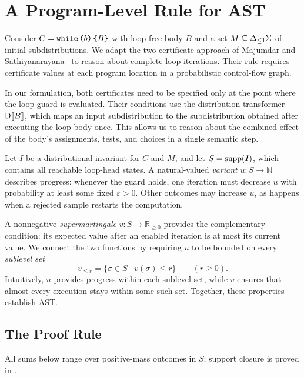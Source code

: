 \section{A Program-Level Rule for AST}
\label{sec:rule}

Consider $C=\textnormal{\texttt{while}}\,\textnormal{\texttt{(}} b\textnormal{\texttt{)}}\,\textnormal{\texttt{\{}} B\textnormal{\texttt{\}}}$ with loop-free body $B$ and a set
$M\subseteq{\Delta_{\leq 1}\Sigma}$ of initial subdistributions.
We adapt the two-certificate approach of Majumdar and
Sathiyanarayana~\cite{DBLP:journals/pacmpl/MajumdarS25}
to reason about complete loop iterations.
Their rule requires certificate values at each program location
in a probabilistic control-flow graph.

In our formulation, both certificates need to be specified
only at the point where the loop guard is evaluated.
Their conditions use the distribution transformer $\mathsf{D}\llbracket B\rrbracket$,
which maps an input subdistribution to the subdistribution
obtained after executing the loop body once.
This allows us to reason about the combined effect of the
body's assignments, tests, and choices in a single semantic step.

Let $I$ be a distributional invariant for $C$ and $M$, and let
$S=\textnormal{supp}(I)$, which contains all reachable loop-head states.
A natural-valued \emph{variant} $u:S\to\mathbb N$ describes progress:
whenever the guard holds, one iteration must decrease $u$ with probability
at least some fixed $\varepsilon>0$. Other outcomes may increase $u$,
as happens when a rejected sample restarts the computation.

A nonnegative \emph{supermartingale} $v:S\to\mathbb R_{\geq0}$
provides the complementary condition: its expected value after an
enabled iteration is at most its current value. We connect the two
functions by requiring $u$ to be bounded on every \emph{sublevel set}
\[
 v_{\leq r}=\{\sigma\in S\mid v(\sigma)\leq r\}
 \qquad(r\geq0).
\]
Intuitively, $u$ provides progress within each sublevel set, while $v$
ensures that almost every execution stays within some such set.
Together, these properties establish AST.

\subsection{The Proof Rule}

All sums below range over positive-mass outcomes in $S$; support closure
is proved in .

